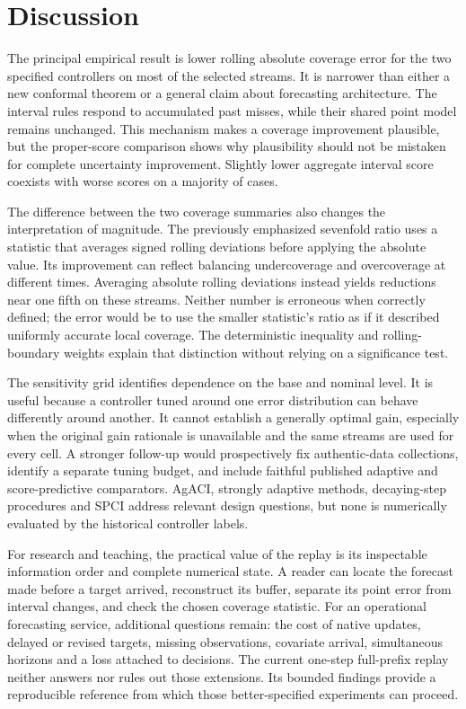 \section{Discussion}
The principal empirical result is lower rolling absolute coverage error for the two specified controllers on most of the selected streams. It is narrower than either a new conformal theorem or a general claim about forecasting architecture. The interval rules respond to accumulated past misses, while their shared point model remains unchanged. This mechanism makes a coverage improvement plausible, but the proper-score comparison shows why plausibility should not be mistaken for complete uncertainty improvement. Slightly lower aggregate interval score coexists with worse scores on a majority of cases.

The difference between the two coverage summaries also changes the interpretation of magnitude. The previously emphasized sevenfold ratio uses a statistic that averages signed rolling deviations before applying the absolute value. Its improvement can reflect balancing undercoverage and overcoverage at different times. Averaging absolute rolling deviations instead yields reductions near one fifth on these streams. Neither number is erroneous when correctly defined; the error would be to use the smaller statistic's ratio as if it described uniformly accurate local coverage. The deterministic inequality and rolling-boundary weights explain that distinction without relying on a significance test.

The sensitivity grid identifies dependence on the base and nominal level. It is useful because a controller tuned around one error distribution can behave differently around another. It cannot establish a generally optimal gain, especially when the original gain rationale is unavailable and the same streams are used for every cell. A stronger follow-up would prospectively fix authentic-data collections, identify a separate tuning budget, and include faithful published adaptive and score-predictive comparators. AgACI, strongly adaptive methods, decaying-step procedures and SPCI address relevant design questions, but none is numerically evaluated by the historical controller labels.

For research and teaching, the practical value of the replay is its inspectable information order and complete numerical state. A reader can locate the forecast made before a target arrived, reconstruct its buffer, separate its point error from interval changes, and check the chosen coverage statistic. For an operational forecasting service, additional questions remain: the cost of native updates, delayed or revised targets, missing observations, covariate arrival, simultaneous horizons and a loss attached to decisions. The current one-step full-prefix replay neither answers nor rules out those extensions. Its bounded findings provide a reproducible reference from which those better-specified experiments can proceed.

